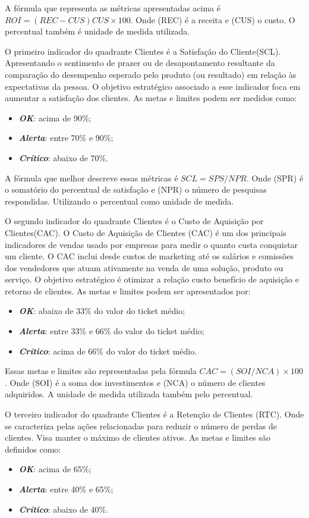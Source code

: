 \documentclass[
	12pt,				%
	openright,			%
	oneside,			%
	a4paper,			%
	english,			%
	brazil				%
	]{abntex2}
\begin{document}
A fórmula que representa as métricas apresentadas acima é $ROI = (REC - CUS) CUS	\times 100$. Onde (REC) é a receita e (CUS) o custo. O percentual também é unidade de medida utilizada. 

O primeiro indicador do quadrante Clientes é a Satisfação do Cliente(SCL). Apresentando o sentimento de prazer ou de desapontamento resultante da comparação do desempenho esperado pelo produto (ou resultado) em relação às expectativas da pessoa. O objetivo estratégico associado a esse indicador foca em aumentar a satisfação dos clientes. As metas e limites podem ser medidos como:
\begin{itemize}
\item  \textbf{\textit{OK}}: acima de 90\%;
\item  \textbf{\textit{Alerta}}: entre 70\% e 90\%;
\item  \textbf{\textit{Crítico}}: abaixo de 70\%.
\end{itemize}

A fórmula que melhor descreve essas métricas é $SCL = SPS/NPR$. Onde (SPR) é o somatório do percentual de satisfação e (NPR) o número de pesquisas respondidas. Utilizando o percentual como unidade de medida.

O segundo indicador do quadrante Clientes é o Custo de Aquisição por Clientes(CAC). O Custo de Aquisição de Clientes (CAC) é um dos principais indicadores de vendas usado por empresas para medir o quanto custa conquistar um cliente. O CAC inclui desde custos de marketing até os salários e comissões dos vendedores que atuam ativamente na venda de uma solução, produto ou serviço. O objetivo estratégico é otimizar a relação custo benefício de aquisição e retorno de clientes. As metas e limites podem ser apresentados por:
\begin{itemize}
\item  \textbf{\textit{OK}}: abaixo de 33\% do valor do ticket médio;
\item  \textbf{\textit{Alerta}}: entre 33\% e 66\% do valor do ticket médio;
\item  \textbf{\textit{Crítico}}: acima de 66\% do valor do ticket médio.
\end{itemize}

Essas metas e limites são representadas pela fórmula $CAC = (SOI/NCA) 	\times 100$. Onde (SOI) é a soma dos investimentos e (NCA) o número de clientes adquiridos. A unidade de medida utilizada também pelo percentual.

O terceiro indicador do quadrante Clientes é a Retenção de Clientes (RTC). Onde se caracteriza pelas ações relacionadas para reduzir o número de perdas de clientes. Visa manter o máximo de clientes ativos. As metas e limites são definidos como:
\begin{itemize}
\item  \textbf{\textit{OK}}: acima de 65\%;
\item  \textbf{\textit{Alerta}}: entre 40\% e 65\%;
\item  \textbf{\textit{Crítico}}: abaixo de 40\%.
\end{itemize}
\end{document}
